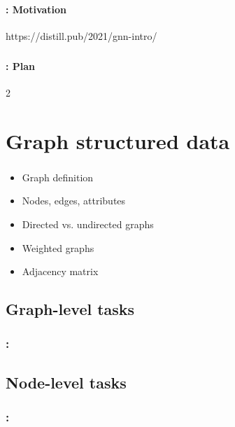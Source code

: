 \documentclass[xcolor=table]{beamer}
\subtitle[GNNs]{Graph Neural Networks}
\begin{document}
\begin{frame}
	\frametitle{\inserttitle}
	\framesubtitle{\insertshortsubtitle: Motivation}
	
	https://distill.pub/2021/gnn-intro/
	
\end{frame}

\begin{frame}
	\frametitle{\inserttitle}
	\framesubtitle{\insertshortsubtitle: Plan}
	
	\begin{multicols}{2}
		\tableofcontents
	\end{multicols}
\end{frame}

\section{Graph structured data}

\begin{frame}
	\frametitle{\insertshortsubtitle}
	\framesubtitle{\insertsection}
	
	\begin{itemize}
		\item Graph definition
		\item Nodes, edges, attributes
		\item Directed vs. undirected graphs
		\item Weighted graphs
		\item Adjacency matrix
	\end{itemize}
	
\end{frame}

\subsection{Graph-level tasks}

\begin{frame}
	\frametitle{\insertshortsubtitle: \insertsection}
	\framesubtitle{\insertsubsection}
	
	
\end{frame}

\subsection{Node-level tasks}

\begin{frame}
	\frametitle{\insertshortsubtitle: \insertsection}
	\framesubtitle{\insertsubsection}
	
	
\end{frame}
\end{document}
